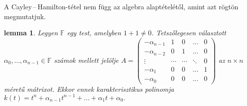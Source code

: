 \documentclass[a4paper, showtrims]{memoir}
\theoremstyle{plain}
\newtheorem{lemma}[proposition]{lemma}
\theoremstyle{remark}
\theoremstyle{definition}
\begin{document}
A Cayley\,--\,Hamilton-tétel nem függ az algebra alaptételétől, amint azt rögtön megmutatjuk.
\begin{lemma}
	Legyen $\mathbb{F}$ egy test, amelyben $1+1\neq 0$.
	Tetszőlegesen választott $\alpha_0,\ldots,\alpha_{n-1}\in\mathbb{F}$ számok mellett
	jelölje
	\(
	A=
	\begin{pmatrix}
		-\alpha_{n-1} & 1      & 0      & \dots  & 0 \\
		-\alpha_{n-2} & 0      & 1      & \dots  & 0 \\
		\vdots        & \cdots & \cdots & \ddots & 0 \\
		-\alpha_1     & 0      & 0      & \dots  & 1 \\
		-\alpha_0     & 0      & 0      & \dots  & 0
	\end{pmatrix}
	\)
	az $n\times n$ méretű mátrixot.
	Ekkor ennek karakterisztikus polinomja
	\begin{math}
		k\left( t \right)
		=
		t^n+\alpha_{n-1}t^{n-1}+\dots+\alpha_1t+\alpha_0.
	\end{math}
\end{lemma}
\end{document}
